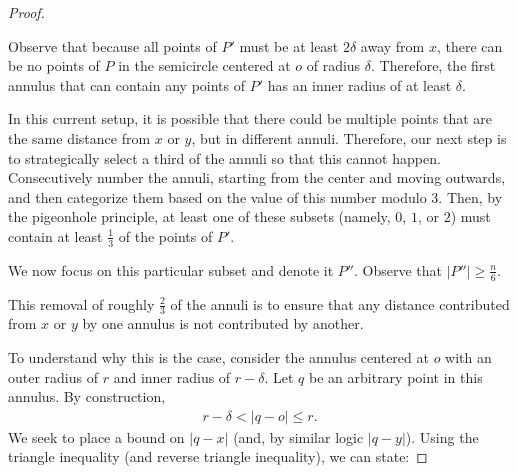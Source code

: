 \documentclass{scrippsthesisclass}
\theoremstyle{definition}
\begin{document}
\begin{proof}
\begin{center}
\end{center}
    Observe that because all points of $P'$ must be at least $2\delta$ away from $x$, there can be no points of $P$ in the semicircle centered at $o$ of radius $\delta$.
    Therefore, the first annulus that can contain any points of $P'$ has an inner radius of at least $\delta$.

    In this current setup, it is possible that there could be multiple points that are the same distance from $x$ or $y$, but in different annuli. 
    Therefore, our next step is to strategically select a third of the annuli so that this cannot happen. 
    Consecutively number the annuli, starting from the center and moving outwards, and then categorize them based on the value of this number modulo $3$. 
    Then, by the pigeonhole principle, at least one of these subsets (namely, $0$, $1$, or $2$) must contain at least $\frac{1}{3}$ of the points of $P'$.

    We now focus on this particular subset and denote it $P''$. 
    Observe that $|P''| \geq \frac{n}{6}$.

    This removal of roughly $\frac{2}{3}$ of the annuli is to ensure that any distance contributed from $x$ or $y$ by one annulus is not contributed by another.

    To understand why this is the case, consider the annulus centered at $o$ with an outer radius of $r$ and inner radius of $r - \delta$. 
    Let $q$ be an arbitrary point in this annulus. 
    By construction, 
    \begin{align}
        r - \delta < |q - o| \leq r.
    \end{align}
    We seek to place a bound on $|q-x|$ (and, by similar logic $|q-y|$). 
    Using the triangle inequality (and reverse triangle inequality), we can state:


\end{proof}
\end{document}
